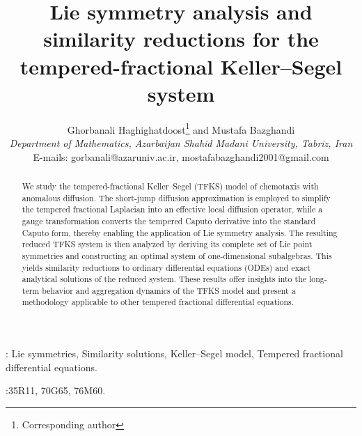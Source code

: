 \documentclass{article}
\renewcommand{\and}{ and }
\begin{document}

\title{Lie symmetry analysis and similarity reductions for the tempered-fractional Keller--Segel system}
\author{
Ghorbanali Haghighatdoost\thanks{Corresponding author} \and Mustafa Bazghandi \\
\textit{\small Department of Mathematics, Azarbaijan Shahid Madani University, Tabriz, Iran} \\
\small E-mails: gorbanali@azaruniv.ac.ir, mostafabazghandi2001@gmail.com
}


\maketitle

\begin{abstract}
We study the tempered-fractional Keller--Segel (TFKS) model of chemotaxis with anomalous diffusion. The short-jump diffusion approximation is employed to simplify the tempered fractional Laplacian into an effective local diffusion operator, while a gauge transformation converts the tempered Caputo derivative into the standard Caputo form, thereby enabling the application of Lie symmetry analysis. The resulting reduced TFKS system is then analyzed by deriving its complete set of Lie point symmetries and constructing an optimal system of one-dimensional subalgebras. This yields similarity reductions to ordinary differential equations (ODEs) and exact analytical solutions of the reduced system. These results offer insights into the long-term behavior and aggregation dynamics of the TFKS model and present a methodology applicable to other tempered fractional differential equations.
\end{abstract}
: Lie symmetries, Similarity solutions, Keller--Segel model, Tempered fractional differential equations.

:35R11, 70G65, 76M60.
\end{document}
